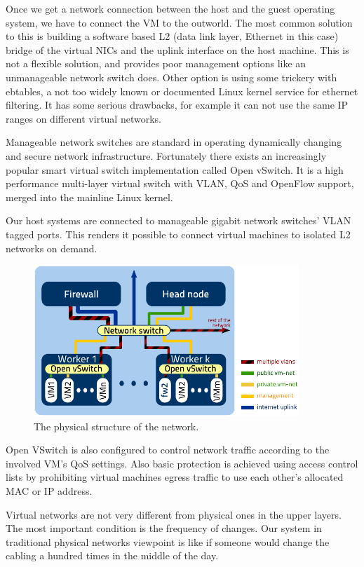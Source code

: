\documentclass{llncs}
\begin{document}
Once we get a network connection between the host and the guest operating system, we have to connect the VM to the outworld. The most common solution to this is building a software based L2 (data link layer, Ethernet in this case) bridge of the virtual NICs and the uplink interface on the host machine. This is not a flexible solution, and provides poor management options like an unmanageable network switch does. Other option is using some trickery with ebtables, a not too widely known or documented Linux kernel service for ethernet filtering. It has some serious drawbacks, for example it can not use the same IP ranges on different virtual networks.

Manageable network switches are standard in operating dynamically changing and secure network infrastructure. Fortunately there exists an increasingly popular smart virtual switch implementation called Open vSwitch. It is a high performance multi-layer virtual switch with VLAN, QoS and OpenFlow support, merged into the mainline Linux kernel.

Our host systems are connected to manageable gigabit network switches' VLAN tagged ports. This renders it possible to connect virtual machines to isolated L2 networks on demand.

\begin{figure}[ht]
    \centering
    \includegraphics[width=10cm]{netarch}
    \caption{The physical structure of the network.}
\end{figure}

Open VSwitch is also configured to control network traffic according to the involved VM's QoS settings. Also basic protection is achieved using access control lists by prohibiting virtual machines egress traffic to use each other's allocated MAC or IP address.

Virtual networks are not very different from physical ones in the upper layers. The most important condition is the frequency of changes. Our system in traditional physical networks viewpoint is like if someone would change the cabling a hundred times in the middle of the day.
\end{document}
